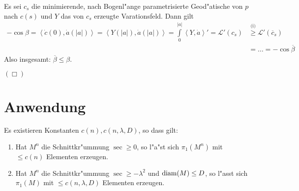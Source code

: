 \begin{emptythm}
\begin{enumerate}[label=(\roman*),leftmargin=*,widest=ii]
\begin{center}
\end{center}
	Es sei $c_s$ die minimierende, nach Bogenl"ange parametrisierte Geod"atische von $p$ nach $c(s)$ und $Y$ das von $c_s$ erzeugte Varationsfeld.
	Dann gilt
	\begin{align*}
		- \cos \beta  = \left<\dot c(0), \dot a(|a|)\right> 
		= \left<Y(|a|), \dot a(|a|) \right>
		= \int\limits_0^{|a|} \left<Y, \dot a\right>'
		= \mathcal L'(c_s)
		&\overset{\text{(i)}}{\geq} \mathcal L'(\overline c_s)\\
		& = \ldots = -\cos \overline \beta
	\end{align*}
	Also insgesamt: $\overline \beta \leq \beta$.
\end{enumerate}
\hfill\ensuremath{(\Box)}
\end{emptythm}


\section{Anwendung}

\begin{Satz}[Gromov]
  Es existieren Konstanten $c(n), c(n,\lambda,D)$, so dass gilt:
  \begin{enumerate}[label=(\roman*)]
  \item Hat $M^n$ die Schnittkr"ummung $\sec \geq 0$, so l"a"st sich $\pi_1(M^n)$ mit $\leq c(n)$ Elementen erzeugen.
  \item Hat $M^n$ die Schnittkr"ummung $\sec \geq - \lambda^2$ und $\operatorname{diam}(M) \leq D$, so l"asst sich $\pi_1(M)$ mit $\leq c(n,\lambda,D)$ Elementen erzeugen.
  \end{enumerate}
\end{Satz}

